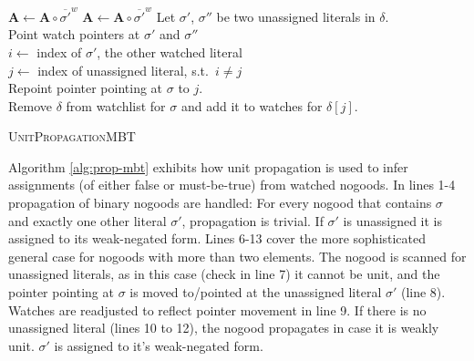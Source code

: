 \documentclass{vutinfth} %
\newcommand{\mbt}{must-be-true}
\newcommand{\negweak}[1]{\overline{#1}^w}
\begin{document}
\begin{algorithm}
  {
    {
      $\mathbf{A} \leftarrow \mathbf{A} \circ \negweak{\sigma'}$
    }
  }
  {
    {
      $\mathbf{A} \leftarrow \mathbf{A} \circ \negweak{\sigma'}$
    }
    {
    }
    \Else%
    {
      Let $\sigma'$, $\sigma''$ be two unassigned literals in $\delta$.\\
      Point watch pointers at $\sigma'$ and $\sigma''$\\
      
      $i \leftarrow $ index of $\sigma'$, the other watched literal\\
      $j \leftarrow $ index of unassigned literal, s.t.~$i \not = j$\\
      Repoint pointer pointing at $\sigma$ to $j$.\\

      Remove $\delta$ from watchlist for $\sigma$ and
      add it to watches for $\delta[j]$.
    }
  }
  \caption{\textsc{UnitPropagationMBT}}
  \label{alg:prop-mbt}
\end{algorithm}

Algorithm \ref{alg:prop-mbt} exhibits how unit propagation is used to infer assignments (of either false or \mbt) from watched nogoods. In lines 1-4 propagation of binary nogoods are handled: For every nogood that contains $\sigma$ and exactly one other literal $\sigma'$, propagation is trivial. If $\sigma'$ is unassigned it is assigned to its weak-negated form.
Lines 6-13 cover the more sophisticated general case for nogoods with more than two elements. The nogood is scanned for unassigned literals, as in this case (check in line 7) it cannot be unit, and the pointer pointing at $\sigma$ is moved to/pointed at the unassigned literal $\sigma'$ (line 8). Watches are readjusted to reflect pointer movement in line 9. If there is no unassigned literal (lines 10 to 12), the nogood propagates in case it is weakly unit. $\sigma'$ is assigned to it's weak-negated form.
\end{document}

